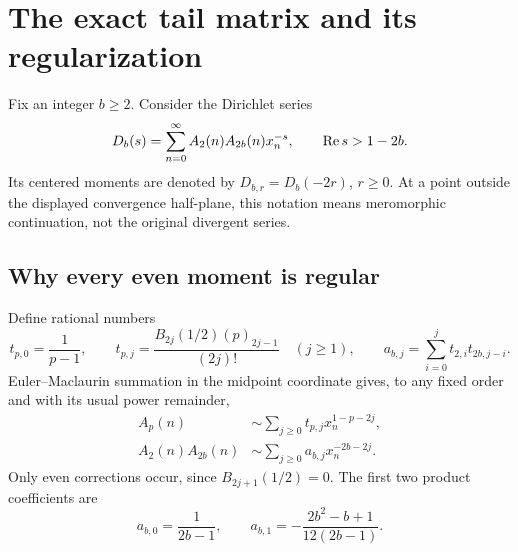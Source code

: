 \section{The exact tail matrix and its regularization}
\label{sec:tail-foundation}

Fix an integer $b\geq2$. Consider the Dirichlet series
\begin{equation}\label{eq:Db}
 D_b(s)=\sum_{n=0}^{\infty}A_2(n)A_{2b}(n)x_n^{-s},
 \qquad \operatorname{Re} s>1-2b.
\end{equation}
Its centered moments are denoted by $D_{b,r}=D_b(-2r)$, $r\geq0$.
At a point outside the displayed convergence half-plane, this notation
means meromorphic continuation, not the original divergent series.

\subsection{Why every even moment is regular}

Define rational numbers
\begin{equation}\label{eq:tail-coefficients}
 t_{p,0}=\frac1{p-1},\qquad
 t_{p,j}=\frac{B_{2j}(1/2)(p)_{2j-1}}{(2j)!}\quad(j\geq1),
 \qquad
 a_{b,j}=\sum_{i=0}^j t_{2,i}t_{2b,j-i}.
\end{equation}
Euler--Maclaurin summation in the midpoint coordinate gives, to any fixed
order and with its usual power remainder,
\begin{align}
 A_p(n)&\sim\sum_{j\geq0}t_{p,j}x_n^{1-p-2j},
 \label{eq:tail-expansion}\\
 A_2(n)A_{2b}(n)&\sim\sum_{j\geq0}a_{b,j}x_n^{-2b-2j}.
 \label{eq:tail-product-expansion}
\end{align}
Only even corrections occur, since $B_{2j+1}(1/2)=0$.
The first two product coefficients are
\begin{equation}\label{eq:first-tail-coeff}
 a_{b,0}=\frac1{2b-1},\qquad
 a_{b,1}=-\frac{2b^2-b+1}{12(2b-1)}.
\end{equation}

